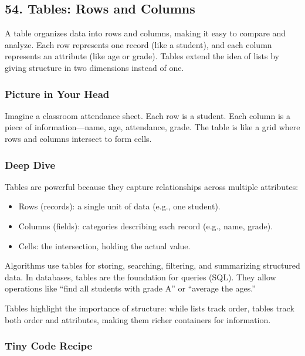 \documentclass[
  letterpaper,
  DIV=11,
  numbers=noendperiod]{scrreprt}
\providecommand{\tightlist}{%
  \setlength{\itemsep}{0pt}\setlength{\parskip}{0pt}}
\begin{document}
\subsection{54. Tables: Rows and Columns}\label{tables-rows-and-columns}

A table organizes data into rows and columns, making it easy to compare
and analyze. Each row represents one record (like a student), and each
column represents an attribute (like age or grade). Tables extend the
idea of lists by giving structure in two dimensions instead of one.

\subsubsection{Picture in Your Head}\label{picture-in-your-head-53}

Imagine a classroom attendance sheet. Each row is a student. Each column
is a piece of information---name, age, attendance, grade. The table is
like a grid where rows and columns intersect to form cells.

\subsubsection{Deep Dive}\label{deep-dive-23}

Tables are powerful because they capture relationships across multiple
attributes:

\begin{itemize}
\tightlist
\item
  Rows (records): a single unit of data (e.g., one student).
\item
  Columns (fields): categories describing each record (e.g., name,
  grade).
\item
  Cells: the intersection, holding the actual value.
\end{itemize}

Algorithms use tables for storing, searching, filtering, and summarizing
structured data. In databases, tables are the foundation for queries
(SQL). They allow operations like ``find all students with grade A'' or
``average the ages.''

Tables highlight the importance of structure: while lists track order,
tables track both order and attributes, making them richer containers
for information.

\subsubsection{Tiny Code Recipe}\label{tiny-code-recipe-51}
\end{document}
